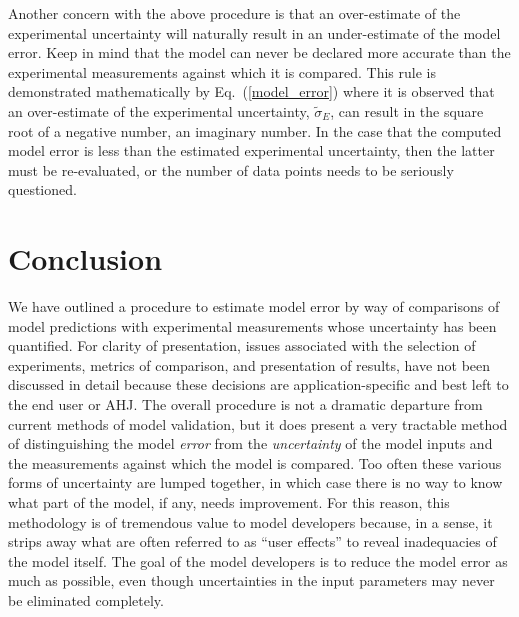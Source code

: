 Another concern with the above procedure is that an over-estimate of the experimental uncertainty will naturally result in an under-estimate of the model error. Keep
in mind that the model can never be declared more accurate than the experimental measurements against which it is compared. This rule is demonstrated
mathematically by Eq.~(\ref{model_error}) where it is observed that an over-estimate of the experimental uncertainty, $\tilde{\sigma}_E$, can result in
the square root of a negative number, an imaginary number. In the case that the computed model error is less than the estimated experimental uncertainty, then the
latter must be re-evaluated, or the number of data points needs to be seriously questioned.



\section{Conclusion}

We have outlined a procedure to estimate model error by way of comparisons of model predictions with experimental measurements whose uncertainty has been
quantified. For clarity of presentation, issues associated with the selection of experiments, metrics of comparison, and presentation of results, have not been
discussed in detail because these decisions are application-specific and best left to the end user or AHJ. The overall procedure is not a dramatic departure from current
methods of model validation, but it does present a very tractable method of distinguishing the model {\em error} from the {\em uncertainty} of the model inputs and the measurements
against which the model is compared. Too often these various forms of uncertainty are lumped together, in which case there is no way to know what part of the model, if
any, needs improvement. For this reason, this methodology is of tremendous value to model developers because, in a sense, it strips away what are often referred to as
``user effects'' to reveal inadequacies of the model itself. The goal of the model developers is to reduce the model error as much as possible, even though
uncertainties in the input parameters may never be eliminated completely.
